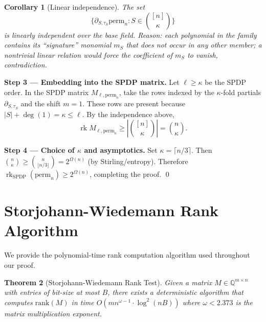 \documentclass[12pt]{article}
\newtheorem{theorem}{Theorem}
\newtheorem{corollary}[theorem]{Corollary}
\theoremstyle{definition}
\theoremstyle{definition}
\theoremstyle{remark}
\theoremstyle{remark}
\begin{document}
\begin{corollary}[Linear independence]
The set
\[
\{ \partial_{S,\tau_S} \mathrm{perm}_n : S \in \binom{[n]}{\kappa} \}
\]
is linearly independent over the base field.
Reason: each polynomial in the family contains its ``signature'' monomial $m_S$ that does not occur in any other member; a nontrivial linear relation would force the coefficient of $m_S$ to vanish, contradiction.
\end{corollary}

\textbf{Step 3 --- Embedding into the SPDP matrix.}
Let $\ell \geq \kappa$ be the SPDP order.
In the SPDP matrix $M_{\ell,\mathrm{perm}_n}$, take the rows indexed by the $\kappa$-fold partials $\partial_{S,\tau_S}$ and the shift $m = 1$.
These rows are present because $|S| + \deg(1) = \kappa \leq \ell$.
By the independence above,
\[
\operatorname{rk} M_{\ell,\mathrm{perm}_n} \geq \left| \binom{[n]}{\kappa} \right| = \binom{n}{\kappa}.
\]

\textbf{Step 4 --- Choice of $\kappa$ and asymptotics.}
Set $\kappa = \lceil n/3 \rceil$. Then $\binom{n}{\kappa} \geq \binom{n}{\lfloor n/3 \rfloor} = 2^{\Omega(n)}$ (by Stirling/entropy).
Therefore $\operatorname{rk}_{\text{SPDP}}(\mathrm{perm}_n) \geq 2^{\Omega(n)}$, completing the proof. \qed


\section{Storjohann-Wiedemann Rank Algorithm}
\label{app:rank-algorithm}

We provide the polynomial-time rank computation algorithm used throughout our proof.

\begin{theorem}[Storjohann-Wiedemann Rank Test]\label{thm:rank-test}
Given a matrix $M \in \mathbb{Q}^{m \times n}$ with entries of bit-size at most $B$, there exists a deterministic algorithm that computes $\text{rank}(M)$ in time $O(mn^{\omega-1} \cdot \log^2(nB))$ where $\omega < 2.373$ is the matrix multiplication exponent.
\end{theorem}
\end{document}
